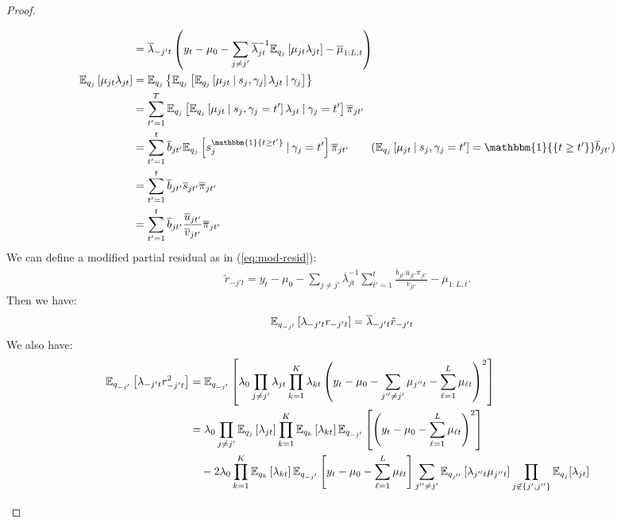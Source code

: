 \begin{proof}
\begin{enumerate}[label=\roman*.]
\begin{align*}
    &=\overline{\lambda}_{-j't} \left(y_t -\mu_0 -  \sum_{j \neq j'}\overline{\lambda}_{jt}^{-1}\E_{q_{j}}\left[ \mu_{jt}\lambda_{jt} \right] -\overline{\mu}_{1:L, t}\right) \\
    \E_{q_{j}}\left[ \mu_{jt}\lambda_{jt} \right] &= \E_{q_{j}}\left\{\E_{q_{j}}\left[\E_{q_{j}}\left[\mu_{j t}\:|\: s_j, \gamma_j\right]\lambda_{j t}\:|\: \gamma_j\right]\right\} \label{eq:lambda-beta} \\
    &= \sum_{t'=1}^T  \E_{q_{j}}\left[\E_{q_{j}}\left[\mu_{j t}\:|\: s_j, \gamma_j = t'\right]\lambda_{j t}\:|\: \gamma_j = t'\right]\overline{\pi}_{j t'} \\
    &= \sum_{t'=1}^t \overline{b}_{j t'}\E_{q_j}\left[s_j^{\mathbbm{1}\{t \geq t'\}}\:|\: \gamma_j= t' \right] \overline{\pi}_{jt'} \tag{$\E_{q_j}\left[\mu_{j t}\:|\: s_j, \gamma_j = t'\right] = \mathbbm{1}{\{t \geq t'\}} \overline{b}_{j t'}$} \\
    &= \sum_{t'=1}^t \overline{b}_{j t'}\overline{s}_{jt'} \overline{\pi}_{jt'} \\
    &=  \sum_{t'=1}^t \overline{b}_{j t'}\frac{\overline{u}_{jt'}}{\overline{v}_{jt'}} \overline{\pi}_{jt'} 
\end{align*}
\normalsize
We can define a modified partial residual as in (\ref{eq:mod-resid}):
\begin{align*}
    \tilde{r}_{-j' t} = y_t - \mu_0 -  \sum_{j \neq j'}\overline{\lambda}_{jt}^{-1}\sum_{t'=1}^t \frac{\overline{b}_{j t'}\overline{u}_{jt'}\overline{\pi}_{jt'}}{\overline{v}_{jt'}} - \overline{\mu}_{1:L, t}.
\end{align*}
Then we have:
\begin{align*}
     \mathbb{E}_{q_{-j'}}\left[\lambda_{-j't}r_{-j't}\right] &=\overline{\lambda}_{-j't}\tilde{r}_{-j' t} 
\end{align*}
We also have:
\footnotesize
\begin{align*}
    \E_{q_{-j'}}\left[\lambda_{-j't}r^2_{-j't}\right] &=  \E_{q_{-j'}}\left[\lambda_0\prod_{j \neq j'}\lambda_{jt} \prod_{k=1}^K \lambda_{kt}\left(y_t - \mu_0 - \sum_{j''\neq j'} \mu_{j''t} - \sum_{\ell=1}^L \mu_{\ell t}\right)^2\right] \\
    &= \lambda_0\prod_{j \neq j'}\E_{q_{j}}\left[\lambda_{jt}\right] \prod_{k=1}^K \E_{q_{k}}\left[\lambda_{kt}\right]\E_{q_{-j'}}\left[\left(y_t - \mu_0 - \sum_{\ell=1}^L \mu_{\ell t}\right)^2\right] \\
    &\quad -2 \lambda_0 \prod_{k=1}^K \E_{q_{k}}\left[\lambda_{kt}\right]\E_{q_{-j'}}\left[y_t - \mu_0  - \sum_{\ell=1}^L \mu_{\ell t}\right] \sum_{j''\neq j'} \E_{q_{j''}}\left[\lambda_{j''t} \mu_{j''t}\right]\prod_{j \not\in \{j',j''\}}\E_{q_{j}}[\lambda_{jt}]  \\

\end{align*}
\end{enumerate}
\end{proof}
